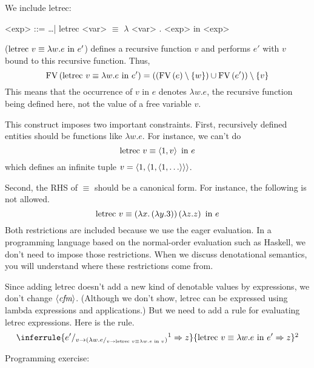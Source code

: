 \begin{enumcirc}
	\item
	We include letrec:
	\begin{center}
		\begin{minipage}{0.7\textwidth}
			\begin{grammar}
				<exp> ::= \dots \;|\; letrec <var> $\equiv$ $\lambda$ <var> . <exp> in <exp>
			\end{grammar}
		\end{minipage}
	\end{center}
	($\lletrec{v}{w}{e}{e'}$)
	defines a recursive function $v$ and performs $e'$ with $v$ bound to this
	recursive function.
	Thus,
	\[
		\fv{\lletrec{v}{w}{e}{e'}} = \prths{\prths{\fv{e} \setminus \braces{w}} \cup \fv{e'}} \setminus \braces{v}
	\]
	This means that the occurrence of $v$ in $e$ denotes $\lambda w . e$, the
	recursive function being defined here, not the value of a free variable $v$.
	\item
	This construct imposes two important constraints.
	First, recursively defined entities should be functions like $\lambda w . e$.
	For instance, we can't do
	\[
		\textrm{letrec } v \equiv \chevrons{1, v} \textrm{ in } e
	\]
	which defines an infinite tuple
	$v = \chevrons{1, \chevrons{1, \chevrons{1, \dots}}}$.

	Second, the RHS of $\equiv$ should be a canonical form.
	For instance, the following is not allowed.
	\[
		\textrm{letrec } v \equiv \prths{\lambda x . \prths{\lambda y . 3}} \prths{\lambda z . z} \textrm{ in } e
	\]
	Both restrictions are included because we use the eager evaluation.
	In a programming language based on the normal-order evaluation such as Haskell,
	we don't need to impose those restrictions.
	When we discuss denotational semantics, you will understand where these
	restrictions come from.
	\item
	Since adding letrec doesn't add a new kind of denotable values by expressions,
	we don't change $\gram{cfm}$.
	(Although we don't show, letrec can be expressed using lambda expressions and applications.)
	But we need to add a rule for evaluating letrec expressions.
	Here is the rule.
	\[
		\inferrule
		{\subst{e'}{v}{\prths{\subst{\lambda w . e}{v}{\lletrec{v}{w}{e}{v}}}} \footnotemark \Rightarrow z}
		{\lletrec{v}{w}{e}{e'} \Rightarrow z}
		\footnotemark
	\]
	\item
	Programming exercise:


\end{enumcirc}
